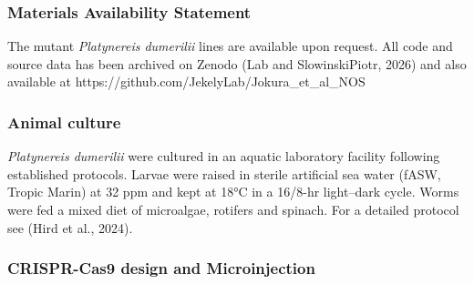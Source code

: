 \documentclass[
  11pt,
  letterpaper,
  DIV=11,
  numbers=noendperiod]{scrartcl}
\begin{document}
\subsubsection{Materials Availability
Statement}\label{materials-availability-statement}

The mutant \emph{Platynereis dumerilii} lines are available upon
request. All code and source data has been archived on Zenodo (Lab and
SlowinskiPiotr, 2026) and also available at
https://github.com/JekelyLab/Jokura\_et\_al\_NOS

\subsubsection{Animal culture}\label{animal-culture}

\emph{Platynereis dumerilii} were cultured in an aquatic laboratory
facility following established protocols. Larvae were raised in sterile
artificial sea water (fASW, Tropic Marin) at 32 ppm and kept at 18°C in
a 16/8-hr light--dark cycle. Worms were fed a mixed diet of microalgae,
rotifers and spinach. For a detailed protocol see (Hird et al., 2024).

\subsubsection{CRISPR-Cas9 design and
Microinjection}\label{crispr-cas9-design-and-microinjection}
\end{document}
